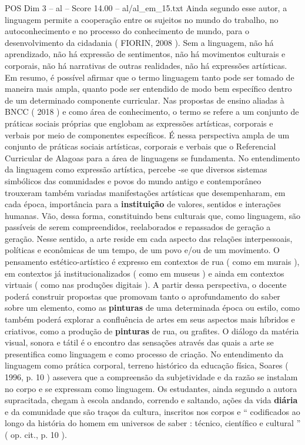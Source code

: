 \begin{textsample}{POS Dim 3 – al – Score 14.00 – al/al\_em\_15.txt}
Ainda segundo esse autor, a linguagem permite a cooperação entre os sujeitos no mundo do trabalho, no autoconhecimento e no processo do conhecimento de mundo, para o desenvolvimento da cidadania ( FIORIN, 2008 ).
Sem a linguagem, não há aprendizado, não há expressão de sentimentos, não há movimentos culturais e corporais, não há narrativas de outras realidades, não há expressões artísticas.
Em resumo, é possível afirmar que o termo linguagem tanto pode ser tomado de maneira mais ampla, quanto pode ser entendido de modo bem específico dentro de um determinado componente curricular.
Nas propostas de ensino aliadas à BNCC ( 2018 ) e como área de conhecimento, o termo se refere a um conjunto de práticas sociais próprias que englobam as expressões artísticas, corporais e verbais por meio de componentes específicos.
É nessa perspectiva ampla de um conjunto de práticas sociais artísticas, corporais e verbais que o Referencial Curricular de Alagoas para a área de linguagens se fundamenta.
No entendimento da linguagem como expressão artística, percebe -se que diversos sistemas simbólicos das comunidades e povos do mundo antigo e contemporâneo trouxeram também variadas manifestações artísticas que desempenharam, em cada época, importância para a \textbf{instituição} de valores, sentidos e interações humanas.
Vão, dessa forma, constituindo bens culturais que, como linguagem, são passíveis de serem compreendidos, reelaborados e repassados de geração a geração.
Nesse sentido, a arte reside em cada aspecto das relações interpessoais, políticas e econômicas de um tempo, de um povo e/ou de um movimento.
O pensamento estético-artístico é expresso em contextos de rua ( como em murais ), em contextos já institucionalizados ( como em museus ) e ainda em contextos virtuais ( como nas produções digitais ).
A partir dessa perspectiva, o docente poderá construir propostas que promovam tanto o aprofundamento do saber sobre um elemento, como as \textbf{pinturas} de uma determinada época ou estilo, como também poderá explorar a confluência de artes em seus aspectos mais híbridos e criativos, como a produção de \textbf{pinturas} de rua, ou grafites.
O diálogo da matéria visual, sonora e tátil é o encontro das sensações através das quais a arte se presentifica como linguagem e como processo de criação.
No entendimento da linguagem como prática corporal, terreno histórico da educação física, Soares ( 1996, p. 10 ) assevera que a compreensão da subjetividade e da razão se instalam no corpo e se expressam como linguagem.
Os estudantes, ainda segundo a autora supracitada, chegam à escola andando, correndo e saltando, ações da vida \textbf{diária} e da comunidade que são traços da cultura, inscritos nos corpos e “ codificados ao longo da história do homem em universos de saber : técnico, científico e cultural ” ( op. cit., p. 10 ).

\end{textsample}
